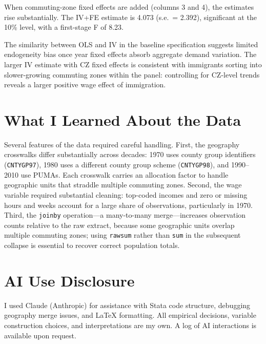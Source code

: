 \documentclass[12pt]{article}
\begin{document}
When commuting-zone fixed effects are added (columns 3 and 4), the
estimates rise substantially. The IV+FE estimate is 4.073 (s.e.\ = 2.392),
significant at the 10\% level, with a first-stage F of 8.23.

The similarity between OLS and IV in the baseline specification suggests
limited endogeneity bias once year fixed effects absorb aggregate demand
variation. The larger IV estimate with CZ fixed effects is consistent
with immigrants sorting into slower-growing commuting zones within the
panel: controlling for CZ-level trends reveals a larger positive wage
effect of immigration.



\section{What I Learned About the Data}

Several features of the data required careful handling. First, the
geography crosswalks differ substantially across decades: 1970 uses
county group identifiers (\texttt{CNTYGP97}), 1980 uses a different
county group scheme (\texttt{CNTYGP98}), and 1990--2010 use PUMAs. Each
crosswalk carries an allocation factor to handle geographic units that
straddle multiple commuting zones. Second, the wage variable required
substantial cleaning: top-coded incomes and zero or missing hours and
weeks account for a large share of observations, particularly in 1970.
Third, the \texttt{joinby} operation---a many-to-many merge---increases
observation counts relative to the raw extract, because some geographic
units overlap multiple commuting zones; using \texttt{rawsum} rather
than \texttt{sum} in the subsequent collapse is essential to recover
correct population totals.

\section{AI Use Disclosure}

I used Claude (Anthropic) for assistance with Stata code structure,
debugging geography merge issues, and LaTeX formatting. All empirical
decisions, variable construction choices, and interpretations are my
own. A log of AI interactions is available upon request.
\end{document}

